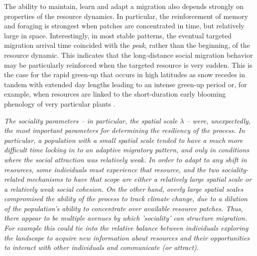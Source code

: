 \documentclass[utf8]{frontiersSCNS} %
\begin{document}
	The ability to maintain, learn and adapt a migration also depends strongly on properties of the resource dynamics. In particular, the reinforcement of memory and foraging is strongest when patches are concentrated in time, but relatively large in space. Interestingly, in most stable patterns, the eventual targeted migration arrival time coincided with the \emph{peak}, rather than the beginning, of the resource dynamic. This indicates that the long-distance social migration behavior may be particularly reinforced when the targeted resource is very sudden. This is the case for the rapid green-up that occurs in high latitudes as snow recedes in tandem with extended day lengths leading to an intense green-up period \citep{Park2020} or, for example, when resources are linked to the short-duration early blooming phenology of very particular plants \citep{Post2007, Renner2018}. 
	
	\textit{The sociality parameters -- in particular, the spatial scale $\lambda$ -- were, unexpectedly, the most important parameters for determining the resiliency of the process. In particular, a population with a small spatial scale tended to have a much more difficult time locking in to an adaptive migratory pattern, and only in conditions where the social attraction was relatively weak. In order to adapt to any shift in resources, \emph{some} individuals must experience that resource, and the two sociality-related mechanisms to have that scope are either a relatively large spatial scale or a relatively weak social cohesion. On the other hand, overly large spatial scales compromised the ability of the process to track climate change, due to a dilution of the population's ability to concentrate over available resource patches. Thus, there appear to be multiple avenues by which 'sociality' can structure migration.   For example this could tie into the relative balance between individuals exploring the landscape to acquire new information about resources and their opportunities to interact with other individuals and communicate (or attract).
	}
\end{document}
